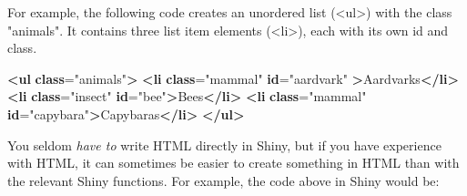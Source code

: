 \documentclass[
  oneside]{book}
\newenvironment{Shaded}{\begin{snugshade}}{\end{snugshade}}
\newcommand{\AttributeTok}[1]{\textcolor[rgb]{0.77,0.63,0.00}{#1}}
\newcommand{\ErrorTok}[1]{\textcolor[rgb]{0.64,0.00,0.00}{\textbf{#1}}}
\newcommand{\FunctionTok}[1]{\textcolor[rgb]{0.00,0.00,0.00}{#1}}
\newcommand{\KeywordTok}[1]{\textcolor[rgb]{0.13,0.29,0.53}{\textbf{#1}}}
\newcommand{\NormalTok}[1]{#1}
\newcommand{\OtherTok}[1]{\textcolor[rgb]{0.56,0.35,0.01}{#1}}
\newcommand{\SpecialCharTok}[1]{\textcolor[rgb]{0.00,0.00,0.00}{#1}}
\newcommand{\StringTok}[1]{\textcolor[rgb]{0.31,0.60,0.02}{#1}}
\begin{document}
For example, the following code creates an unordered list (\NormalTok{<ul>}) with the \NormalTok{class} \StringTok{"animals"}. It contains three list item elements (\NormalTok{<li>}), each with its own \NormalTok{id} and \NormalTok{class}.

\begin{Shaded}
\begin{Highlighting}[]
\KeywordTok{\textless{}ul} \ErrorTok{class}\OtherTok{=}\StringTok{"animals"}\KeywordTok{\textgreater{}}
    \KeywordTok{\textless{}li} \ErrorTok{class}\OtherTok{=}\StringTok{"mammal"} \ErrorTok{id}\OtherTok{=}\StringTok{"aardvark"} \KeywordTok{\textgreater{}}\NormalTok{Aardvarks}\KeywordTok{\textless{}/li\textgreater{}}
    \KeywordTok{\textless{}li} \ErrorTok{class}\OtherTok{=}\StringTok{"insect"} \ErrorTok{id}\OtherTok{=}\StringTok{"bee"}\KeywordTok{\textgreater{}}\NormalTok{Bees}\KeywordTok{\textless{}/li\textgreater{}}
    \KeywordTok{\textless{}li} \ErrorTok{class}\OtherTok{=}\StringTok{"mammal"} \ErrorTok{id}\OtherTok{=}\StringTok{"capybara"}\KeywordTok{\textgreater{}}\NormalTok{Capybaras}\KeywordTok{\textless{}/li\textgreater{}}
\KeywordTok{\textless{}/ul\textgreater{}}
\end{Highlighting}
\end{Shaded}

You seldom \emph{have to} write HTML directly in Shiny, but if you have experience with HTML, it can sometimes be easier to create something in HTML than with the relevant Shiny functions. For example, the code above in Shiny would be:

\begin{Shaded}
\end{Shaded}
\end{document}

